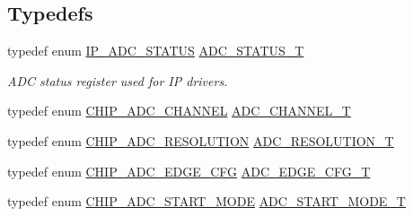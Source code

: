 \subsection*{Typedefs}
\begin{DoxyCompactItemize}
\item 
typedef enum \hyperlink{group___a_d_c__18_x_x__43_x_x_ga4cdc8cd4b1ae4721ff5de44c783f310a}{I\+P\+\_\+\+A\+D\+C\+\_\+\+S\+T\+A\+T\+US} \hyperlink{group___a_d_c__18_x_x__43_x_x_ga5e2ef3f894759bbb12a9abf68518cbb7}{A\+D\+C\+\_\+\+S\+T\+A\+T\+U\+S\+\_\+T}
\begin{DoxyCompactList}\small\item\em A\+DC status register used for IP drivers. \end{DoxyCompactList}\item 
typedef enum \hyperlink{group___a_d_c__18_x_x__43_x_x_ga67b0a9ec8f34cf712b1f1c0119ba3d50}{C\+H\+I\+P\+\_\+\+A\+D\+C\+\_\+\+C\+H\+A\+N\+N\+EL} \hyperlink{group___a_d_c__18_x_x__43_x_x_ga30ee7058bc7cc1daff718b29b42bed4e}{A\+D\+C\+\_\+\+C\+H\+A\+N\+N\+E\+L\+\_\+T}
\item 
typedef enum \hyperlink{group___a_d_c__18_x_x__43_x_x_ga6da04ef4d158a6d61909481ed94df1a3}{C\+H\+I\+P\+\_\+\+A\+D\+C\+\_\+\+R\+E\+S\+O\+L\+U\+T\+I\+ON} \hyperlink{group___a_d_c__18_x_x__43_x_x_ga515c7ef9570ef08b29f55cd880e2e452}{A\+D\+C\+\_\+\+R\+E\+S\+O\+L\+U\+T\+I\+O\+N\+\_\+T}
\item 
typedef enum \hyperlink{group___a_d_c__18_x_x__43_x_x_gaba28e4e0734cc41087bae0c96d5090a8}{C\+H\+I\+P\+\_\+\+A\+D\+C\+\_\+\+E\+D\+G\+E\+\_\+\+C\+FG} \hyperlink{group___a_d_c__18_x_x__43_x_x_ga18d12879b004e16af3b47467a2d81d56}{A\+D\+C\+\_\+\+E\+D\+G\+E\+\_\+\+C\+F\+G\+\_\+T}
\item 
typedef enum \hyperlink{group___a_d_c__18_x_x__43_x_x_ga125e3c848732e5fa6e064354f618f57c}{C\+H\+I\+P\+\_\+\+A\+D\+C\+\_\+\+S\+T\+A\+R\+T\+\_\+\+M\+O\+DE} \hyperlink{group___a_d_c__18_x_x__43_x_x_ga68aae5a89b4dabc910e457a00e57ea8c}{A\+D\+C\+\_\+\+S\+T\+A\+R\+T\+\_\+\+M\+O\+D\+E\+\_\+T}
\end{DoxyCompactItemize}
